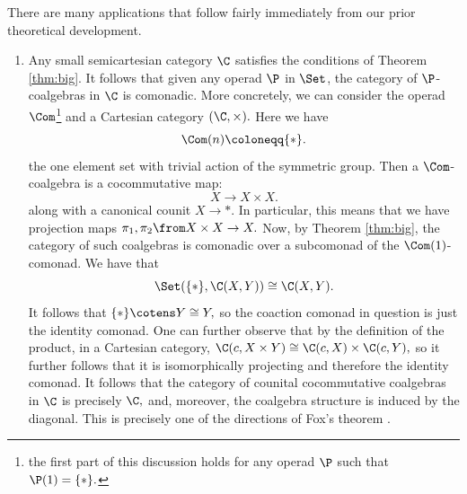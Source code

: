 \documentclass{tac}
\begin{document}
There are many applications that follow fairly immediately from our prior theoretical development. 
\begin{enumerate}
    \item 
    Any small semicartesian category $\C$ satisfies the conditions of Theorem \ref{thm:big}. It follows that given any operad $\P$ in $\Set$, the category of $\P$-coalgebras in $\C$ is comonadic. More concretely, we can consider the operad $\Com$\footnote{the first part of this discussion holds for any operad $\P$ such that $\P(1) = \{\ast\}.$} and a Cartesian category $(\C, \times).$ Here we have 
    $$
    \Com(n) \coloneqq \{\ast\}.
    $$
    the one element set with trivial action of the symmetric group. Then a $\Com$-coalgebra is a cocommutative map:
    $$
    X\to X \times X.
    $$
    along with a canonical counit $X \to \ast.$ In particular, this means that we have projection maps $\pi_1, \pi_2\from X\times X \to X.$ Now, by Theorem \ref{thm:big}, the category of such coalgebras is comonadic over a subcomonad of the $\Com(1)$-comonad. We have that 
    $$
    \Set(\{\ast \}, \C(X, Y)) \cong \C(X, Y).
    $$
    It follows that $\{\ast\} \cotens Y \cong Y,$ so the coaction comonad in question is just the identity comonad. One can further observe that by the definition of the product, in a Cartesian category, $\C(c, X\times Y) \cong \C(c, X) \times \C(c, Y),$ so it further follows that it is isomorphically projecting and therefore the identity comonad. It follows that the category of counital cocommutative coalgebras in $\C$ is precisely $\C,$ and, moreover, the coalgebra structure is induced by the diagonal. This is precisely one of the directions of Fox's theorem \cite{fox76}. 


\end{enumerate}
\end{document}
